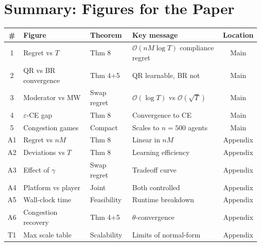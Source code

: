 \documentclass[11pt]{article}
\newcommand{\bigO}{\mathcal{O}}
\begin{document}
\section{Summary: Figures for the Paper}

\begin{table}[h]
\centering\small
\begin{tabular}{clllc}
\toprule
\# & Figure & Theorem & Key message & Location \\
\midrule
1 & Regret vs $T$ & Thm 8 & $\bigO(nM\log T)$ compliance regret & Main \\
2 & QR vs BR convergence & Thm 4+5 & QR learnable, BR not & Main \\
3 & Moderator vs MW & Swap regret & $\bigO(\log T)$ vs $\bigO(\sqrt{T})$ & Main \\
4 & $\varepsilon$-CE gap & Thm 8 & Convergence to CE & Main \\
5 & Congestion games & Compact & Scales to $n{=}500$ agents & Main \\
\midrule
A1 & Regret vs $nM$ & Thm 8 & Linear in $nM$ & Appendix \\
A2 & Deviations vs $T$ & Thm 8 & Learning efficiency & Appendix \\
A3 & Effect of $\gamma$ & Swap regret & Tradeoff curve & Appendix \\
A4 & Platform vs player & Joint & Both controlled & Appendix \\
A5 & Wall-clock time & Feasibility & Runtime breakdown & Appendix \\
A6 & Congestion recovery & Thm 4+5 & $\theta$-convergence & Appendix \\
\midrule
T1 & Max scale table & Scalability & Limits of normal-form & Appendix \\
\bottomrule
\end{tabular}
\end{table}
\end{document}
